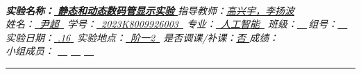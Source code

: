 \documentclass[UTF8]{article}
\theoremstyle{MyLineTheoremStyle} %
\theoremstyle{MyBlockTheoremStyle} %
\theoremstyle{MySubsubsectionStyle} %
\begin{document}
\begin{center}\large
    \\\vspace{0.4cm}
    \noindent\textit{
        \textbf{\bfseries 实验名称：}\uline{\hspace{0.8cm} \bfseries 静态和动态数码管显示实验 \hspace{0.8cm}}\hspace{0.4cm} 
        指导教师：\uline{\hspace{0.5cm}高兴宇，李扬波\hspace{0.5cm}}}
    \\\vspace{0.1cm}
    \noindent\textit{
        姓名：\uline{\,\,\,尹超\,\,\,}\hspace{0.2cm}
        学号：\uline{\,\,\,{\upshape 2023K8009926003}\,\,\,}\hspace{0.2cm}
        专业：\uline{\,\,\,人工智能\,\,\,}\hspace{0.2cm}
        班级：\uline{\,\,\,\,\,\,}\,组号：\uline{\,\,\,\,\,\,}}
    \\\vspace{0.1cm}
    \noindent\textit{
        实验日期：\uline{\,\,{.16}\,\,}\hspace{0.2cm}
        实验地点：\uline{\,\,\,{\upshape 阶一2}\,\,\,}\hspace{0.2cm}
        是否调课/补课：\uline{\hspace{0.26cm}否 \hspace{0.26cm}}\hspace{0.2cm}
        成绩：\uline{\hspace{2cm}}}
    \\\vspace{0.1cm}
    \noindent\textit{
        小组成员：
        \uline{\,\,\,\,\,\,}\hspace{0.2cm}
        \uline{\,\,\,\,\,\,}\hspace{0.2cm}
        \uline{\,\,\,\,\,\,}\hspace{0.2cm}
    }
\end{center}
\noindent\rule{\textwidth}{0.1em}   %
\end{document}
